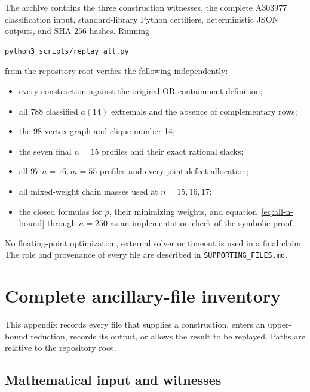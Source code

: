\documentclass[11pt]{article}
\begin{document}
The archive contains the three construction witnesses, the complete A303977
classification input, standard-library Python certifiers, deterministic JSON
outputs, and SHA-256 hashes.  Running
\begin{verbatim}
python3 scripts/replay_all.py
\end{verbatim}
from the repository root verifies the following independently:
\begin{itemize}
 \item every construction against the original OR-containment definition;
 \item all 788 classified $a(14)$ extremals and the absence of complementary
       rows;
 \item the 98-vertex graph and clique number 14;
 \item the seven final $n=15$ profiles and their exact rational slacks;
 \item all 97 $n=16,m=55$ profiles and every joint defect allocation;
 \item all mixed-weight chain masses used at $n=15,16,17$;
 \item the closed formulas for $\rho$, their minimizing weights, and
       equation~\eqref{eq:all-n-bound} through $n=250$ as an implementation
       check of the symbolic proof.
\end{itemize}
No floating-point optimization, external solver or timeout is used in a final
claim.  The role and provenance of every file are described in
\texttt{SUPPORTING\_FILES.md}.

\appendix

\section{Complete ancillary-file inventory}\label{app:files}

This appendix records every file that supplies a construction, enters an
upper-bound reduction, records its output, or allows the result to be replayed.
Paths are relative to the repository root.

\subsection{Mathematical input and witnesses}
\end{document}
